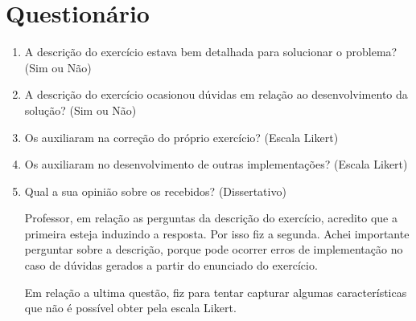\chapter{Questionário}
\label{apendice:questionario}


\begin{enumerate}
	\item A descrição do exercício estava bem detalhada para solucionar o problema? (Sim ou Não)
	\item A descrição do exercício ocasionou dúvidas em relação ao desenvolvimento da solução? (Sim ou Não)
	
	\item Os  auxiliaram na correção do próprio exercício? (Escala Likert)
	
	\item Os  auxiliaram no desenvolvimento de outras implementações? (Escala Likert)
	
	\item Qual a sua opinião sobre os  recebidos? (Dissertativo)
	
	Professor, em relação as perguntas da descrição do exercício, acredito que a primeira esteja induzindo a resposta. Por isso fiz a segunda. Achei importante perguntar sobre a descrição, porque pode ocorrer erros de implementação no caso de dúvidas gerados a partir do enunciado do exercício.
	
	Em relação a ultima questão, fiz para tentar capturar algumas características que não é possível obter pela escala Likert.
\end{enumerate}